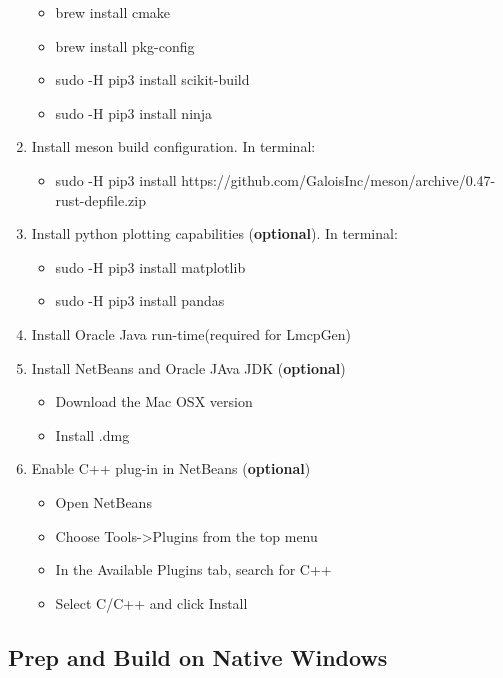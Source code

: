 \begin{enumerate}
  \begin{itemize}
  \item
    brew install cmake
  \item
    brew install pkg-config
  \item
    sudo -H pip3 install scikit-build
  \item
    sudo -H pip3 install ninja
  \end{itemize}
\item
  Install meson build configuration. In terminal:

  \begin{itemize}
  \tightlist
  \item
    sudo -H pip3 install https://github.com/GaloisInc/meson/archive/0.47-rust-depfile.zip
  \end{itemize}
\item
  Install python plotting capabilities (\textbf{optional}). In terminal:

  \begin{itemize}
  \item
    sudo -H pip3 install matplotlib
  \item
    sudo -H pip3 install pandas
  \end{itemize}
\item
  Install Oracle Java run-time(required for LmcpGen)
\item
  Install NetBeans and Oracle JAva JDK (\textbf{optional})

  \begin{itemize}
  \item
    Download the Mac OSX version
  \item
    Install .dmg
  \end{itemize}
\item
  Enable C++ plug-in in NetBeans (\textbf{optional})

  \begin{itemize}
  \item
    Open NetBeans
  \item
    Choose Tools-\textgreater{}Plugins from the top menu
  \item
    In the Available Plugins tab, search for C++
  \item
    Select C/C++ and click Install
  \end{itemize}
\end{enumerate}

\subsection{Prep and Build on Native
Windows}\label{prep-and-build-on-native-windows}

